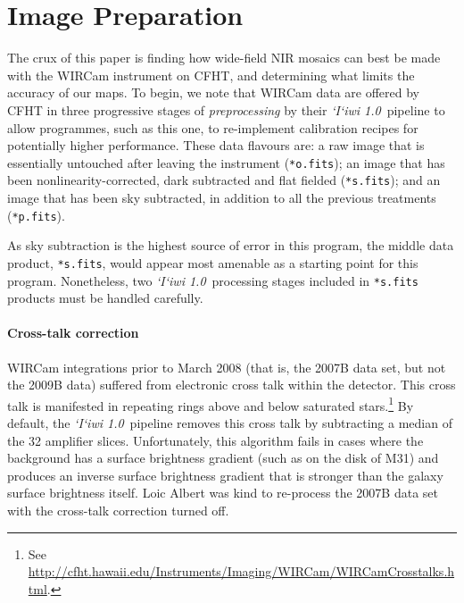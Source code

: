 \documentclass[iop]{emulateapj}
\newcommand{\sw}[1]{\textit{#1}} %
\newcommand{\iiwione}{\sw{`I`iwi 1.0}}
\begin{document}
\section{Image Preparation}
\label{sec:reduction}

The crux of this paper is finding how wide-field NIR mosaics can best be made with the WIRCam instrument on CFHT, and determining what limits the accuracy of our maps.
To begin, we note that WIRCam data are offered by CFHT in three progressive stages of \emph{preprocessing} by their \iiwione\ pipeline to allow programmes, such as this one, to re-implement calibration recipes for potentially higher performance.
These data flavours are: a raw image that is essentially untouched after leaving the instrument (\texttt{*o.fits}); an image that has been nonlinearity-corrected, dark subtracted and flat fielded (\texttt{*s.fits}); and an image that has been sky subtracted, in addition to all the previous treatments (\texttt{*p.fits}).

As sky subtraction is the highest source of error in this program, the middle data product, \texttt{*s.fits}, would appear most amenable as a starting point for this program.
Nonetheless, two \iiwione\ processing stages included in \texttt{*s.fits} products must be handled carefully.

\paragraph{Cross-talk correction} WIRCam integrations prior to March 2008 (that is, the 2007B data set, but not the 2009B data) suffered from electronic cross talk within the detector.
This cross talk is manifested in repeating rings above and below saturated stars.\footnote{See \url{http://cfht.hawaii.edu/Instruments/Imaging/WIRCam/WIRCamCrosstalks.html}.}
By default, the \iiwione\ pipeline removes this cross talk by subtracting a median of the 32 amplifier slices.
Unfortunately, this algorithm fails in cases where the background has a surface brightness gradient (such as on the disk of M31) and produces an inverse surface brightness gradient that is stronger than the galaxy surface brightness itself.
Loic Albert was kind to re-process the 2007B data set with the cross-talk correction turned off.
\end{document}
